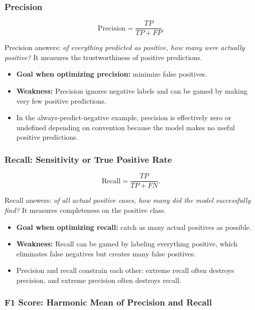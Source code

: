 \documentclass[12pt,openany]{book}
\begin{document}
\subsubsection{Precision}

\begin{equation*}
    \text{Precision} = \frac{TP}{TP+FP}.
\end{equation*}

Precision answers: \textit{of everything predicted as positive, how many were actually positive?} It measures the trustworthiness of positive predictions.

\begin{itemize}[leftmargin=*]
    \item \textbf{Goal when optimizing precision:} minimize false positives.
    \item \textbf{Weakness:} Precision ignores negative labels and can be gamed by making very few positive predictions.
    \item In the always-predict-negative example, precision is effectively zero or undefined depending on convention because the model makes no useful positive predictions.
\end{itemize}

\subsubsection{Recall: Sensitivity or True Positive Rate}

\begin{equation*}
    \text{Recall} = \frac{TP}{TP+FN}.
\end{equation*}

Recall answers: \textit{of all actual positive cases, how many did the model successfully find?} It measures completeness on the positive class.

\begin{itemize}[leftmargin=*]
    \item \textbf{Goal when optimizing recall:} catch as many actual positives as possible.
    \item \textbf{Weakness:} Recall can be gamed by labeling everything positive, which eliminates false negatives but creates many false positives.
    \item Precision and recall constrain each other: extreme recall often destroys precision, and extreme precision often destroys recall.
\end{itemize}

\subsubsection{F1 Score: Harmonic Mean of Precision and Recall}
\end{document}
